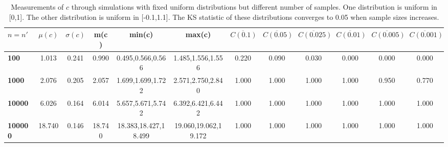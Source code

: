 \begin{table*}[h!]
\vspace{-.3cm}
\begin{center}
\begin{tabular}{| l | c | c | c | c | c | c | c | c | c | c | c |}\hline
$n=n'$ & $\mu(c)$ & $\sigma(c)$ & m(c) & min(c) & max(c) & $\overline{C(0.1)}$ & $\overline{C(0.05)}$ & $\overline{C(0.025)}$ & $\overline{C(0.01)}$ & $\overline{C(0.005)}$ & $\overline{C(0.001)}$ \\\hline\hline
{\bf 100} & 1.013 & 0.241 & 0.990 & 0.495,0.566,0.566 & 1.485,1.556,1.556 & 0.220 & 0.090 & 0.030 & 0.000 & 0.000 & 0.000 \\\hline
{\bf 1000} & 2.076 & 0.205 & 2.057 & 1.699,1.699,1.722 & 2.571,2.750,2.840 & 1.000 & 1.000 & 1.000 & 1.000 & 0.950 & 0.770 \\\hline
{\bf 10000} & 6.026 & 0.164 & 6.014 & 5.657,5.671,5.742 & 6.392,6.421,6.442 & 1.000 & 1.000 & 1.000 & 1.000 & 1.000 & 1.000 \\\hline
{\bf 100000} & 18.740 & 0.146 & 18.740 & 18.383,18.427,18.499 & 19.060,19.062,19.172 & 1.000 & 1.000 & 1.000 & 1.000 & 1.000 & 1.000 \\\hline
\end{tabular}
\caption{Measurements of $c$ through simulations
        with fixed uniform distributions but different number of samples.
        One distribution is uniform in [0,1].
        The other distribution is uniform in [-0.1,1.1].
        The KS statistic of these distributions converges
        to 0.05 when sample sizes increases.}
\end{center}
\end{table*}